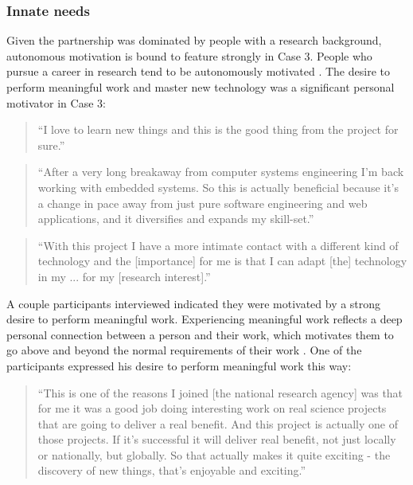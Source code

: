 \subsubsection{Innate needs}

Given the partnership was dominated by people with a research background, autonomous motivation is bound to feature strongly in Case 3. People who pursue a career in research tend to be autonomously motivated \citep{ryan2014work,suominen2021gold}. The desire to perform meaningful work and master new technology was a significant personal motivator in Case 3:

\begin{quote}
\small
\enquote{I love to learn new things and this is the good thing from the project for sure.} \\
\end{quote}

\begin{quote}
\small
\enquote{After a very long breakaway from computer systems engineering I'm back working with embedded systems. So this is actually beneficial because it's a change in pace away from just pure software engineering and web applications, and it diversifies and expands my skill-set.} \\
\end{quote}

\begin{quote}
\small
\enquote{With this project I have a more intimate contact with a different kind of technology and the [importance] for me is that I can adapt [the] technology in my ... for my [research interest].} \\
\end{quote}

A couple participants interviewed indicated they were motivated by a strong desire to perform meaningful work. Experiencing meaningful work reflects a deep personal connection between a person and their work, which motivates them to go above and beyond the normal requirements of their work \citep{van2018motivational}. One of the participants expressed his desire to perform meaningful work this way:

\begin{quote}
\small
\enquote{This is one of the reasons I joined [the national research agency] was that for me it was a good job doing interesting work on real science projects that are going to deliver a real benefit. And this project is actually one of those projects. If it's successful it will deliver real benefit, not just locally or nationally, but globally. So that actually makes it quite exciting - the discovery of new things, that's enjoyable and exciting.} \\
\end{quote}
 
